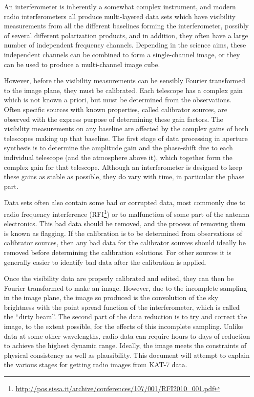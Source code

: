 \documentclass[force,almostfull,justified]{tufte-book}
\begin{document}
An interferometer is inherently a somewhat complex instrument, and modern radio interferometers all
produce multi-layered data sets which have visibility measurements from all the different baselines
forming the interferometer, possibly of several different polarization products, and in addition, they
often have a large number of independent frequency channels.  Depending in the science aims, these
independent channels can be combined to form a single-channel image, or they can be used to produce a
multi-channel image cube.

However, before the visibility measurements can be sensibly Fourier transformed to the image plane,
they must be calibrated.  Each telescope has a complex gain which is not known a priori, but must be
determined from the observations.  Often specific sources with known properties, called calibrator
sources, are observed with the express purpose of determining these gain factors.  The visibility
measurements on any baseline are affected by the complex gains of both telescopes making up that
baseline.  The first stage of data processing in aperture synthesis is to determine the amplitude gain
and the phase-shift due to each individual telescope (and the atmosphere above it), which together
form the complex gain for that telescope.  Although an interferometer is designed to keep these gains
as stable as possible, they do vary with time, in particular the phase part.

Data sets often also contain some bad or corrupted data, most commonly due to radio frequency
interference (RFI\footnote{\url{http://pos.sissa.it/archive/conferences/107/001/RFI2010_001.pdf}}) or
to malfunction of some part of the antenna electronics.  This bad data should be removed, and the
process of removing them is known as flagging. If the calibration is to be determined from
observations of calibrator sources, then any bad data for the calibrator sources should ideally be
removed before determining the calibration solutions.  For other sources it is generally easier to
identify bad data after the calibration is applied.

Once the visibility data are properly calibrated and edited, they can then be Fourier transformed to
make an image.  However, due to the incomplete sampling in the image plane, the image so produced is
the convolution of the sky brightness with the point spread function of the interferometer, which is
called the ``dirty beam''.  The second part of the data reduction is to try and correct the image, to
the extent possible, for the effects of this incomplete sampling.  Unlike data at some other
wavelengths, radio data can require hours to days of reduction to achieve the highest dynamic range.
Ideally, the image meets the constraints of physical consistency as well as plausibility.  This
document will attempt to explain the various stages for getting radio images from KAT-7 data.
\end{document}
